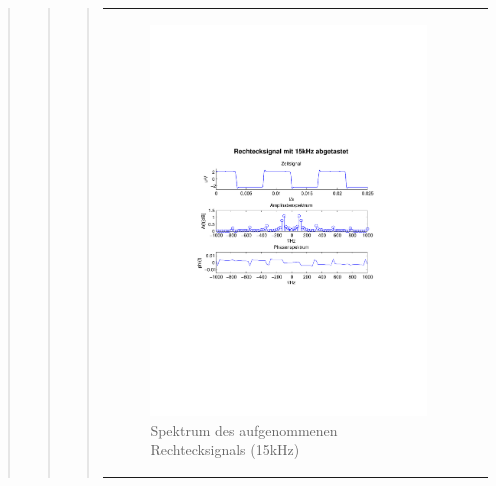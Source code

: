 \begin{quote}
\begin{quote}
\begin{quote}
\begin{center}
\begin{tabular}{ll}
\begin{minipage}{0.6\textwidth}
                    \end{minipage}
                    \begin{minipage}{0.6\textwidth}
    
                        \begin{figure}[H]
                            \label{fig:}
                            \includegraphics[scale=0.65, trim = 3cm 9cm 3cm
                            8.5cm,
                            clip]{./Bilder/6_2_rechteck_15kHz}
                            \caption{Spektrum des aufgenommenen Rechtecksignals
                            (15kHz)}
                        \end{figure}
                    \vspace{-1.5em}
    

\end{minipage}
\end{tabular}
\end{center}
\end{quote}
\end{quote}
\end{quote}
